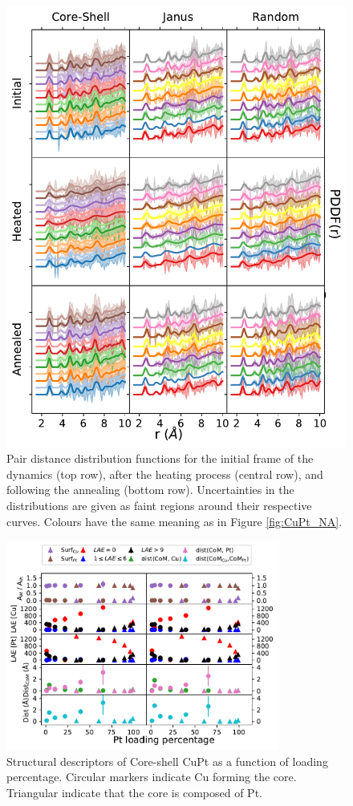 \begin{figure}
    \centering
    \includegraphics{figures/MD/Alloys/Melt_Cu-Pt.pdf}
    \caption{Pair distance distribution functions for the initial frame of the dynamics (top row), after the heating process (central row), and following the annealing (bottom row). Uncertainties in the distributions are given as faint regions around their respective curves. Colours have the same meaning as in Figure \ref{fig:CuPt_NA}. }
    \label{fig:CuPt_PDF}
\end{figure}

\begin{figure}
    \centering
    \includegraphics[width=0.8\textwidth]{figures/MD/Alloys/Core-Shell_Cu-Pt.pdf}
    \caption{Structural descriptors of Core-shell CuPt as a function of loading percentage. Circular markers indicate Cu forming the core. Triangular indicate that the core is composed of Pt.}
    \label{fig:CuPtCS_Dyn}
\end{figure}


